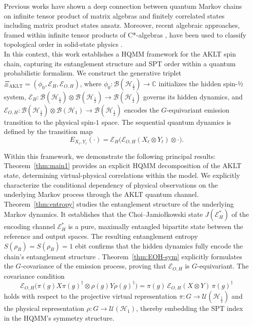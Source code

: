 \documentclass[12pt,a4paper]{article}
\begin{document}
Previous works have shown a deep connection between quantum Markov chains on infinite tensor product of matrix algebras and finitely correlated states including matrix product states ansatz\cite{FNW92}. Moreover, recent algebraic approaches, framed within infinite tensor products of C*-algebras \cite{BR}, have been used to classify topological order in solid-state physics \cite{O21, O22, Tas23}.\\ %
In this context, this work establishes a  HQMM  framework for the AKLT spin chain, capturing its entanglement structure and  SPT order within a quantum probabilistic formalism. We construct the generative triplet $\Xi_{\mathrm{AKLT}} = (\phi_0, \mathcal{E}_H, \mathcal{E}_{O,H})$,
where $\phi_0: \mathcal{B}(\mathcal{H}_{\frac{1}{2}}) \to \mathbb{C}$ initializes the hidden spin-½ system, $\mathcal{E}_H: \mathcal{B}(\mathcal{H}_{\frac{1}{2}}) \otimes \mathcal{B}(\mathcal{H}_{\frac{1}{2}}) \to \mathcal{B}(\mathcal{H}_{\frac{1}{2}})$ governs its hidden dynamics, and $\mathcal{E}_{O,H}: \mathcal{B}(\mathcal{H}_{\frac{1}{2}}) \otimes \mathcal{B}(\mathcal{H}_{1}) \to \mathcal{B}(\mathcal{H}_{\frac{1}{2}})$ encodes the $G$-equivariant emission transition to the physical spin-$1$ space. The sequential quantum dynamics is defined by the transition map
\begin{equation*}
    E_{X_\ell,Y_\ell}(\cdot) = \mathcal{E}_H\big(\mathcal{E}_{O,H}(X_\ell \otimes Y_\ell) \otimes \cdot\big).
\end{equation*}

Within this framework, we demonstrate the following principal results:  Theorem~\ref{thm:main1} provides an explicit HQMM decomposition of the AKLT state, determining virtual-physical correlations within the model. We explicitly characterize the conditional dependency of physical observations on the underlying Markov process through the AKLT quantum channel.
 Theorem~\ref{thm:entropy}  studies the entanglement structure of the underlying Markov dynamics. It establishes that the Choi–Jamiołkowski state $J(\mathcal{E}_H^*)$ of the encoding channel $\mathcal{E}_H^*$ is a pure, maximally entangled bipartite state between the reference and output spaces. The resulting entanglement entropy $S(\rho_R) = S(\rho_B) = 1$ ebit confirms that the hidden dynamics fully encode the chain's entanglement structure \cite{FC2024, Kitaev06}. Theorem~\ref{thm:EOH-sym} explicitly formulates the $G$-covariance of the emission process, proving that $\mathcal{E}_{O,H}$ is $G$-equivariant. The covariance condition
\[
\mathcal{E}_{O,H}\big(\pi(g)X\pi(g)^\dagger \otimes \rho(g)Y\rho(g)^\dagger\big) = \pi(g)\,\mathcal{E}_{O,H}(X \otimes Y)\,\pi(g)^\dagger
\]
holds with respect to the projective virtual representation $\pi: G \to \mathcal{U}(\mathcal{H}_{\frac{1}{2}})$ and the physical representation $\rho: G \to \mathcal{U}(\mathcal{H}_1)$, thereby embedding the SPT index in the HQMM's symmetry structure.
\end{document}

